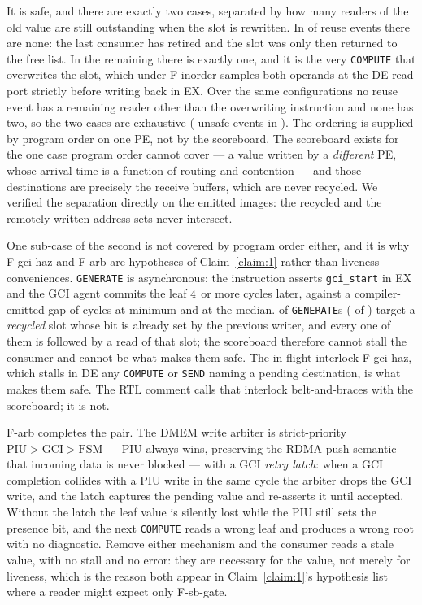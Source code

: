\documentclass[journal,10pt]{IEEEtran}
\theoremstyle{plain}
\theoremstyle{definition}
\theoremstyle{remark}
\newcommand{\sv}[1]{\texttt{#1}}
\begin{document}
It is safe, and there are exactly two cases, separated by how many readers of
the old value are still outstanding when the slot is rewritten. In
\RecycleZeroReaderPct{} of reuse events there are none: the last consumer has
retired and the slot was only then returned to the free list. In the
remaining \RecycleSelfReaderPct{} there is exactly one, and it is the very
\texttt{COMPUTE} that overwrites the slot, which under \textsf{F-inorder}
samples both operands at the \textsf{DE} read port strictly before writing
back in \textsf{EX}. Over the same configurations no reuse event has a
remaining reader other than the overwriting instruction and none has two, so
the two cases are exhaustive (\RecycleUnsafe{} unsafe events in
\RecycleEvents{}). The ordering is supplied by program order on one PE, not
by the scoreboard. The scoreboard exists for the one case program order
cannot cover --- a value written by a \emph{different} PE, whose arrival time
is a function of routing and contention --- and those destinations are
precisely the receive buffers, which are never recycled. We verified the
separation directly on the emitted images: the recycled and the
remotely-written address sets never intersect.

One sub-case of the second is not covered by program order either, and it is
why \textsf{F-gci-haz} and \textsf{F-arb} are hypotheses of
Claim~\ref{claim:1} rather than liveness conveniences. \texttt{GENERATE} is
asynchronous: the instruction asserts \sv{gci\_start} in \textsf{EX} and the
GCI agent commits the leaf $4$ or more cycles later, against a
compiler-emitted gap of \GciGapMin{} cycles at minimum and \GciGapMedian{} at
the median. \GenRecycledPct{} of \texttt{GENERATE}s (\GenRecycled{} of
\GenTotal{}) target a \emph{recycled} slot whose bit is already set by the
previous writer, and every one of them is followed by a read of that slot; the
scoreboard therefore cannot stall the consumer and cannot be what makes them
safe. The in-flight interlock \textsf{F-gci-haz}, which stalls in \textsf{DE}
any \texttt{COMPUTE} or \texttt{SEND} naming a pending destination, is what
makes them safe. The RTL comment calls that interlock belt-and-braces with
the scoreboard; it is not.

\textsf{F-arb} completes the pair. The DMEM write arbiter is strict-priority
$\mathrm{PIU} > \mathrm{GCI} > \mathrm{FSM}$ --- PIU always wins, preserving
the RDMA-push semantic that incoming data is never blocked --- with a GCI
\emph{retry latch}: when a GCI completion collides with a PIU write in the
same cycle the arbiter drops the GCI write, and the latch captures the
pending value and re-asserts it until accepted. Without the latch the leaf
value is silently lost while the PIU still sets the presence bit, and the
next \texttt{COMPUTE} reads a wrong leaf and produces a wrong root with no
diagnostic. Remove either mechanism and the consumer reads a stale value,
with no stall and no error: they are necessary for the value, not merely for
liveness, which is the reason both appear in Claim~\ref{claim:1}'s hypothesis
list where a reader might expect only \textsf{F-sb-gate}.
\end{document}
